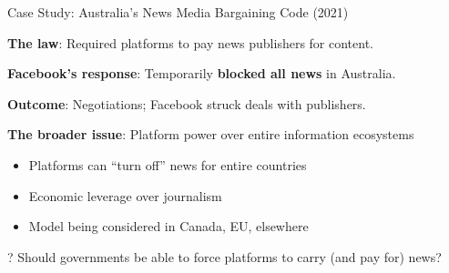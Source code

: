 ﻿\documentclass[aspectratio=169]{beamer}
\begin{document}
\begin{frame}{Case Study: Australia's News Media Bargaining Code (2021)}
\begin{casestudybox}
\textbf{The law}: Required platforms to pay news publishers for content.

\textbf{Facebook's response}: Temporarily \textbf{blocked all news} in Australia.

\textbf{Outcome}: Negotiations; Facebook struck deals with publishers.
\end{casestudybox}

\vspace{0.3cm}
\textbf{The broader issue}: Platform power over entire information ecosystems

\begin{itemize}
    \item Platforms can ``turn off'' news for entire countries
    \item Economic leverage over journalism
    \item Model being considered in Canada, EU, elsewhere
\end{itemize}

\begin{alertblock}{?}
Should governments be able to force platforms to carry (and pay for) news?
\end{alertblock}
\end{frame}
\end{document}
